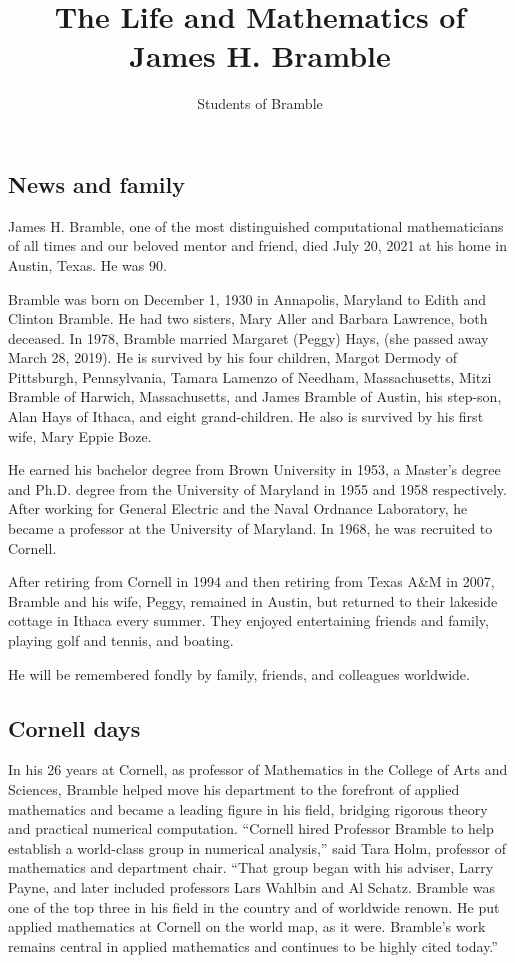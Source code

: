 \documentclass[CJK,11pt]{amsart}
\theoremstyle{definition}
\begin{document}
\begin{CJK*}{UTF8}{gbsn}
\title{
The Life and Mathematics of James H. Bramble
}
\author{Students of Bramble}
\maketitle

\section{News and family}
James H. Bramble, one of the most distinguished computational mathematicians of all times and our beloved mentor and friend, died July 20, 2021 at his home in Austin, Texas. He was 90.

Bramble was born on December 1, 1930 in Annapolis, Maryland to Edith and Clinton Bramble. He had two sisters, Mary Aller and Barbara Lawrence, both deceased. 
In 1978, Bramble married Margaret (Peggy) Hays, (she passed away March 28, 2019). 
He is survived by his four children, Margot Dermody of Pittsburgh, Pennsylvania, Tamara Lamenzo of Needham, Massachusetts, Mitzi Bramble of Harwich, Massachusetts, and James Bramble of Austin, his step-son, Alan Hays of Ithaca, and eight grand-children. He also is survived by his first wife, Mary Eppie Boze. 

 He earned his bachelor degree from Brown University in
  1953, a Master's degree and Ph.D. degree from the University of
  Maryland in 1955 and 1958 respectively.  After working for General
  Electric and the Naval Ordnance Laboratory, he became a professor at
  the University of Maryland.  In 1968, he was recruited to Cornell.

After retiring from Cornell in 1994 and then retiring from Texas A\&M
in 2007, Bramble and his wife, Peggy, remained in Austin, but returned
to their lakeside cottage in Ithaca every summer.  They enjoyed
entertaining friends and family, playing golf and tennis, and boating.

He will be remembered fondly by family, friends, and colleagues worldwide.

\subsection{Cornell days}
In his 26 years at Cornell, as professor of Mathematics in the College of Arts and Sciences,  Bramble helped move his department to the forefront of applied mathematics and became a leading figure in his field, bridging rigorous theory and practical numerical computation.  “Cornell hired Professor Bramble to help establish a world-class group in numerical analysis,” said Tara Holm, professor of mathematics and department chair. “That group began with his adviser, Larry Payne, and later included professors Lars Wahlbin and Al Schatz. Bramble was one of the top three in his field in the country and of worldwide renown. He put applied mathematics at Cornell on the world map, as it were. Bramble's work remains central in applied mathematics and continues to be highly cited today.”


\end{CJK*}
\end{document}

